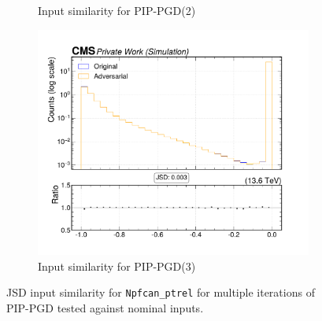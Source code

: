 \begin{figure}[htbp]
\begin{subfigure}[t]{0.32\textwidth}
    \caption*{Input similarity for PIP-PGD(2)}
  \end{subfigure}\hfill
  \begin{subfigure}[t]{0.32\textwidth}
    \includegraphics[width=\linewidth]{media/output/features/compare/combined_it_3/cmp_npf_arr_Npfcan_ptrel.pdf}
    \caption*{Input similarity for PIP-PGD(3)}
  \end{subfigure}

  \caption*{JSD input similarity for \texttt{Npfcan\_ptrel} for multiple iterations of PIP-PGD tested against nominal inputs.}
  \label{fig:combined_input_Npfcan_ptrel}
\end{figure}


